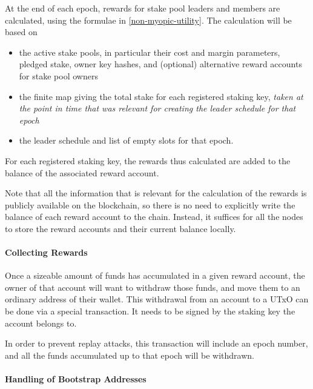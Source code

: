 \documentclass[11pt,a4paper]{article}
\begin{document}
At the end of each epoch, rewards for stake pool leaders and members
are calculated, using the formulae in \cref{non-myopic-utility}. The
calculation will be based on
\begin{itemize}
\item the active stake pools, in particular their cost and margin
  parameters, pledged stake, owner key hashes, and (optional)
  alternative reward accounts for stake pool owners
\item the finite map giving the total stake for each registered
  staking key, \emph{taken at the point in time that was relevant for
    creating the leader schedule for that epoch}
\item the leader schedule and list of empty slots for that epoch.
\end{itemize}
For each registered staking key, the rewards thus calculated are added
to the balance of the associated reward account.

Note that all the information that is relevant for the calculation of
the rewards is publicly available on the blockchain, so there is no
need to explicitly write the balance of each reward account to the
chain. Instead, it suffices for all the nodes to store the reward
accounts and their current balance locally.

\paragraph{Collecting Rewards}

Once a sizeable amount of funds has accumulated in a given reward
account, the owner of that account will want to withdraw those funds,
and move them to an ordinary address of their wallet. This withdrawal
from an account to a UTxO can be done via a special transaction. It
needs to be signed by the staking key the account belongs to.

In order to prevent replay attacks, this transaction will include an
epoch number, and all the funds accumulated up to that epoch will be
withdrawn.

\paragraph{Handling of Bootstrap Addresses}
\label{handling-of-bootstrap-addresses}
\end{document}
